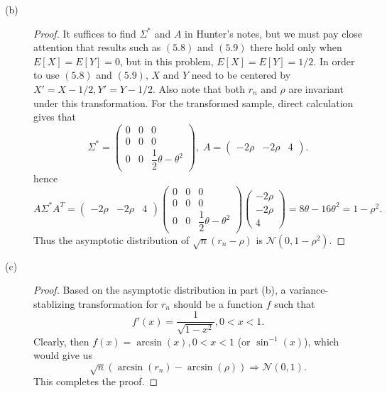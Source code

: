 \documentclass{article}
\newcommand{\gaussian}{\mathcal{N}}
\theoremstyle{definition}
\theoremstyle{plain}
\theoremstyle{remark}
\begin{document}
\begin{description}
\begin{description}
\item[(b)]
\begin{proof}
It suffices to find $\Sigma^*$ and $A$ in Hunter's notes, but we must  pay close attention that results such as $(5.8)$ and $(5.9)$ there hold only when $E[X] = E[Y] = 0$, but in this problem, 
$E[X] = E[Y] = 1/2$.  In order to use $(5.8)$ and $(5.9)$, $X$ and $Y$ need to be centered by $X' = X - 1/2, Y' = Y - 1/2$. Also note that both $r_n$ and $\rho$ are invariant under this transformation. For the transformed sample, direct calculation gives that 
\begin{equation*}
\Sigma^* = 
\begin{pmatrix}
0 & 0 & 0 \\
0 & 0 & 0 \\
0 & 0 & \dfrac{1}{2}\theta - \theta^2
\end{pmatrix}, \;
A = \begin{pmatrix} -2\rho & -2\rho & 4\end{pmatrix}.
\end{equation*}
hence
\begin{equation*}
A\Sigma^*A^T = \begin{pmatrix} -2\rho & -2\rho & 4 \end{pmatrix}
\begin{pmatrix}
0 & 0 & 0 \\
0 & 0 & 0 \\
0 & 0 & \dfrac{1}{2}\theta - \theta^2
\end{pmatrix}
\begin{pmatrix} -2\rho \\ -2\rho \\ 4 \end{pmatrix}
= 8\theta - 16\theta^2 = 1 - \rho^2.
\end{equation*}
Thus the asymptotic distribution of $\sqrt{n}(r_n - \rho)$ is $\boxed{\gaussian(0, 1 - \rho^2)}$.
\end{proof}

\item[(c)]
\begin{proof}
Based on the asymptotic distribution in part (b), a variance-stablizing transformation for $r_n$ should be a function $f$ such that 
$$f'(x) = \frac{1}{\sqrt{1 - x^2}}, 0 < x < 1.$$ 
Clearly, then $f(x) = \arcsin(x), 0 < x < 1$ (or $\sin^{-1}(x)$), which would give us
$$\sqrt{n}(\arcsin(r_n) - \arcsin(\rho)) \Rightarrow \gaussian(0, 1).$$
This completes the proof.
\end{proof}
\end{description}
\end{description}
\end{document}

